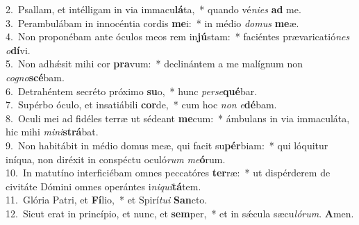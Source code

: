 {2.~}Psallam, et intélligam in via immacu\textbf{lá}ta,~* quando vé\textit{ni}\textit{es} \textbf{ad} me.\\
{3.~}Perambulábam in innocéntia cordis \textbf{me}i:~* in médio \textit{do}\textit{mus} \textbf{me}æ.\\
{4.~}Non proponébam ante óculos meos rem in\textbf{jú}stam:~* faciéntes prævaricatió\textit{nes} \textit{o}\textbf{dí}vi.\\
{5.~}Non adhǽsit mihi cor \textbf{pra}vum:~* declinántem a me malígnum non \textit{co}\textit{gno}\textbf{scé}bam.\\
{6.~}Detrahéntem secréto próximo \textbf{su}o,~* hunc \textit{per}\textit{se}\textbf{qué}bar.\\
{7.~}Supérbo óculo, et insatiábili \textbf{cor}de,~* cum hoc \textit{non} \textit{e}\textbf{dé}bam.\\
{8.~}Oculi mei ad fidéles terræ ut sédeant \textbf{me}cum:~* ámbulans in via immaculáta, hic mihi \textit{mi}\textit{ni}\textbf{strá}bat.\\
{9.~}Non habitábit in médio domus meæ, qui facit su\textbf{pér}biam:~* qui lóquitur iníqua, non diréxit in conspéctu oculó\textit{rum} \textit{me}\textbf{ó}rum.\\
{10.~}In matutíno interficiébam omnes peccatóres \textbf{ter}ræ:~* ut dispérderem de civitáte Dómini omnes operántes i\textit{ni}\textit{qui}\textbf{tá}tem.\\
{11.~}Glória Patri, et \textbf{Fí}lio,~* et Spirí\textit{tu}\textit{i} \textbf{San}cto.\\
{12.~}Sicut erat in princípio, et nunc, et \textbf{sem}per,~* et in sǽcula sæcu\textit{ló}\textit{rum}. \textbf{A}men.\\
